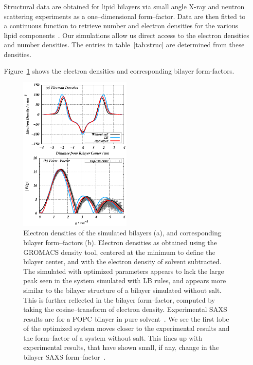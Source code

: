 \documentclass[12pt,openany,final]{book}
\begin{document}
Structural data are obtained for lipid bilayers via small angle X-ray and neutron scattering
experiments as a one--dimensional form--factor. Data are then
fitted to a continuous function to retrieve number and electron
densities for the various lipid components~\cite{nagle:2000,fogarty:2015}. 
Our simulations allow us direct access to the electron densities and number densities. 
The entries in table~\ref{tab:struc} are determined from these densities.

Figure~\ref{fig:eldens} shows the electron densities and corresponding bilayer form-factors. 
\begin{figure}[h!]
    \caption[Electron densities]{
    Electron densities of the simulated bilayers (a), and corresponding bilayer form--factors (b).
    Electron densities as obtained using the GROMACS density tool,
    centered at the minimum to define the bilayer center, and with the electron density of solvent subtracted.
    The simulated with optimized parameters appears to lack the large peak seen in the system simulated
    with LB rules, and appears more similar to the
bilayer structure of a bilayer simulated without salt. 
This is further reflected in the bilayer form--factor, 
computed by taking the cosine--transform of electron density. Experimental
SAXS results are for a POPC bilayer in pure solvent~\cite{fogarty:2015}. We see the first lobe
of the optimized system moves closer to the experimental results and the form--factor of a system without salt. This lines up with experimental results, that have shown small, if any, change
in the bilayer SAXS form--factor~\cite{pabst:2007,petrache:2006:swelling,uhrikova:2008}.}
    \label{fig:eldens}
    \includegraphics[width=0.5\textwidth,trim=-0cm 0 0 0]{figure_4_ch1.eps}
\end{figure}
\end{document}
